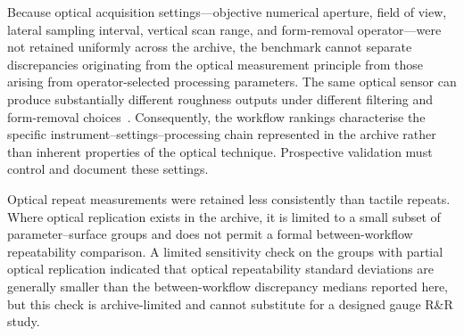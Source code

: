 \documentclass{article}
\begin{document}
Because optical acquisition settings---objective numerical aperture, field of view, lateral sampling interval, vertical scan range, and form-removal operator---were not retained uniformly across the archive, the benchmark cannot separate discrepancies originating from the optical measurement principle from those arising from operator-selected processing parameters. The same optical sensor can produce substantially different roughness outputs under different filtering and form-removal choices~\cite{ISO16610-21-2011,Boedecker2010}. Consequently, the workflow rankings characterise the specific instrument--settings--processing chain represented in the archive rather than inherent properties of the optical technique. Prospective validation must control and document these settings.

Optical repeat measurements were retained less consistently than tactile repeats. Where optical replication exists in the archive, it is limited to a small subset of parameter--surface groups and does not permit a formal between-workflow repeatability comparison. A limited sensitivity check on the groups with partial optical replication indicated that optical repeatability standard deviations are generally smaller than the between-workflow discrepancy medians reported here, but this check is archive-limited and cannot substitute for a designed gauge R\&R study.
\end{document}
